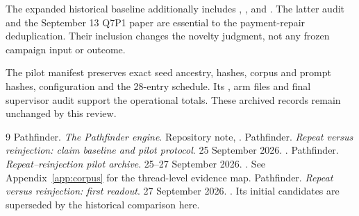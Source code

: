 \documentclass[11pt,a4paper]{article}
\begin{document}
The expanded historical baseline additionally includes
,
, and
.
The latter audit and the September 13 Q7P1 paper are essential to the
payment-repair deduplication. Their inclusion changes the novelty judgment,
not any frozen campaign input or outcome.

The pilot manifest preserves exact seed ancestry, hashes, corpus and prompt
hashes, configuration and the 28-entry schedule. Its ,
arm  files and final supervisor audit support the
operational totals. These archived records remain unchanged by this review.

\begin{thebibliography}{9}
 Pathfinder. \emph{The Pathfinder engine}.
Repository note, .
 Pathfinder. \emph{Repeat versus reinjection: claim
baseline and pilot protocol}. 25 September 2026.
.
 Pathfinder. \emph{Repeat--reinjection pilot archive}.
25--27 September 2026. .
See Appendix~\ref{app:corpus} for the thread-level evidence map.
 Pathfinder. \emph{Repeat versus reinjection: first readout}.
27 September 2026. .
Its initial candidates are superseded by the historical comparison here.
\end{thebibliography}
\end{document}
